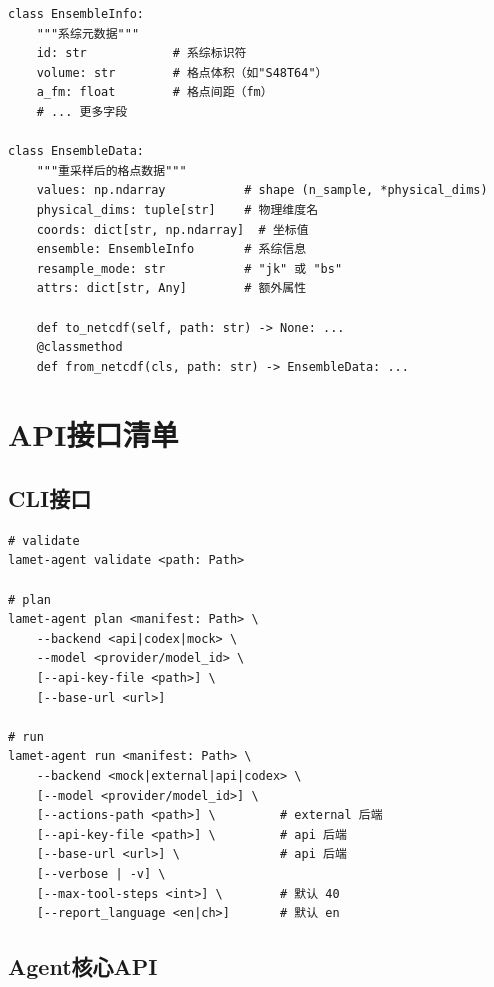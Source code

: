 \documentclass[12pt,a4paper]{ctexart}
\begin{document}
\begin{lstlisting}[caption={数据容器接口}]
class EnsembleInfo:
    """系综元数据"""
    id: str            # 系综标识符
    volume: str        # 格点体积（如"S48T64"）
    a_fm: float        # 格点间距（fm）
    # ... 更多字段

class EnsembleData:
    """重采样后的格点数据"""
    values: np.ndarray           # shape (n_sample, *physical_dims)
    physical_dims: tuple[str]    # 物理维度名
    coords: dict[str, np.ndarray]  # 坐标值
    ensemble: EnsembleInfo       # 系综信息
    resample_mode: str           # "jk" 或 "bs"
    attrs: dict[str, Any]        # 额外属性

    def to_netcdf(self, path: str) -> None: ...
    @classmethod
    def from_netcdf(cls, path: str) -> EnsembleData: ...
\end{lstlisting}

\section{API接口清单}

\subsection{CLI接口}

\begin{lstlisting}[caption={CLI命令签名}]
# validate
lamet-agent validate <path: Path>

# plan
lamet-agent plan <manifest: Path> \
    --backend <api|codex|mock> \
    --model <provider/model_id> \
    [--api-key-file <path>] \
    [--base-url <url>]

# run
lamet-agent run <manifest: Path> \
    --backend <mock|external|api|codex> \
    [--model <provider/model_id>] \
    [--actions-path <path>] \         # external 后端
    [--api-key-file <path>] \         # api 后端
    [--base-url <url>] \              # api 后端
    [--verbose | -v] \
    [--max-tool-steps <int>] \        # 默认 40
    [--report_language <en|ch>]       # 默认 en
\end{lstlisting}

\subsection{Agent核心API}
\end{document}
